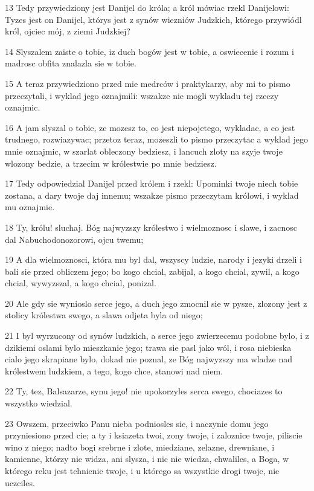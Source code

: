 \par 13 Tedy przywiedziony jest Danijel do króla; a król mówiac rzekl Danijelowi: Tyzes jest on Danijel, którys jest z synów wiezniów Judzkich, którego przywiódl król, ojciec mój, z ziemi Judzkiej?
\par 14 Slyszalem zaiste o tobie, iz duch bogów jest w tobie, a oswiecenie i rozum i madrosc obfita znalazla sie w tobie.
\par 15 A teraz przywiedziono przed mie medrców i praktykarzy, aby mi to pismo przeczytali, i wyklad jego oznajmili: wszakze nie mogli wykladu tej rzeczy oznajmic.
\par 16 A jam slyszal o tobie, ze mozesz to, co jest niepojetego, wykladac, a co jest trudnego, rozwiazywac; przetoz teraz, mozeszli to pismo przeczytac a wyklad jego mnie oznajmic, w szarlat obleczony bedziesz, i lancuch zloty na szyje twoje wlozony bedzie, a trzecim w królestwie po mnie bedziesz.
\par 17 Tedy odpowiedzial Danijel przed królem i rzekl: Upominki twoje niech tobie zostana, a dary twoje daj innemu; wszakze pismo przeczytam królowi, i wyklad mu oznajmie.
\par 18 Ty, królu! sluchaj. Bóg najwyzszy królestwo i wielmoznosc i slawe, i zacnosc dal Nabuchodonozorowi, ojcu twemu;
\par 19 A dla wielmoznosci, która mu byl dal, wszyscy ludzie, narody i jezyki drzeli i bali sie przed obliczem jego; bo kogo chcial, zabijal, a kogo chcial, zywil, a kogo chcial, wywyzszal, a kogo chcial, ponizal.
\par 20 Ale gdy sie wynioslo serce jego, a duch jego zmocnil sie w pysze, zlozony jest z stolicy królestwa swego, a slawa odjeta byla od niego;
\par 21 I byl wyrzucony od synów ludzkich, a serce jego zwierzecemu podobne bylo, i z dzikiemi oslami bylo mieszkanie jego; trawa sie pasl jako wól, i rosa niebieska cialo jego skrapiane bylo, dokad nie poznal, ze Bóg najwyzszy ma wladze nad królestwem ludzkiem, a tego, kogo chce, stanowi nad niem.
\par 22 Ty, tez, Balsazarze, synu jego! nie upokorzyles serca swego, chociazes to wszystko wiedzial.
\par 23 Owszem, przeciwko Panu nieba podniosles sie, i naczynie domu jego przyniesiono przed cie; a ty i ksiazeta twoi, zony twoje, i zaloznice twoje, piliscie wino z niego; nadto bogi srebrne i zlote, miedziane, zelazne, drewniane, i kamienne, którzy nie widza, ani slysza, i nic nie wiedza, chwaliles, a Boga, w którego reku jest tchnienie twoje, i u którego sa wszystkie drogi twoje, nie uczciles.
